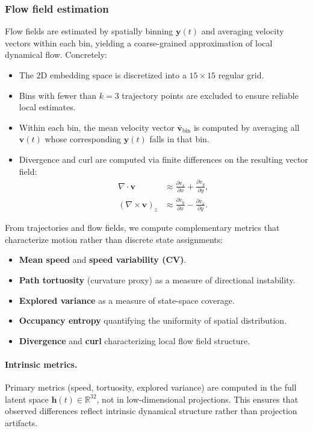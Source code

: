 \documentclass[5p,twocolumn,authoryear]{elsarticle}
\begin{document}
\subsubsection{Flow field estimation}
\label{sec:flow_field_estimation}
Flow fields are estimated by spatially binning $\mathbf{y}(t)$ and averaging velocity vectors within each bin, yielding a coarse-grained approximation of local dynamical flow. Concretely:
\begin{itemize}
    \item The 2D embedding space is discretized into a $15 \times 15$ regular grid.
    \item Bins with fewer than $k=3$ trajectory points are excluded to ensure reliable local estimates.
    \item Within each bin, the mean velocity vector $\bar{\mathbf{v}}_{\mathrm{bin}}$ is computed by averaging all $\mathbf{v}(t)$ whose corresponding $\mathbf{y}(t)$ falls in that bin.
    \item Divergence and curl are computed via finite differences on the resulting vector field:
    \begin{align}
    \nabla \cdot \mathbf{v} &\approx \frac{\partial v_x}{\partial x} + \frac{\partial v_y}{\partial y}, \\
    (\nabla \times \mathbf{v})_z &\approx \frac{\partial v_y}{\partial x} - \frac{\partial v_x}{\partial y}.
    \end{align}
\end{itemize}

From trajectories and flow fields, we compute complementary metrics that characterize motion rather than discrete state assignments:
\begin{itemize}
    \item \textbf{Mean speed} and \textbf{speed variability (CV)}.
    \item \textbf{Path tortuosity} (curvature proxy) as a measure of directional instability.
    \item \textbf{Explored variance} as a measure of state-space coverage.
    \item \textbf{Occupancy entropy} quantifying the uniformity of spatial distribution.
    \item \textbf{Divergence} and \textbf{curl} characterizing local flow field structure.
\end{itemize}

\paragraph{Intrinsic metrics.}
Primary metrics (speed, tortuosity, explored variance) are computed in the full latent space $\mathbf{h}(t) \in \mathbb{R}^{32}$, not in low-dimensional projections. This ensures that observed differences reflect intrinsic dynamical structure rather than projection artifacts.
\end{document}
